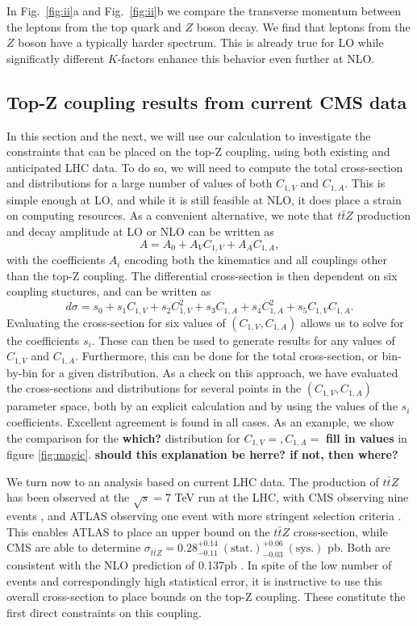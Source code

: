 \documentclass[preprint]{JHEP3} %
\def\ttbZ{t\bar{t}Z}
\begin{document}
In Fig.~\ref{fig:ii}a and Fig.~\ref{fig:ii}b we compare the transverse momentum between the leptons from the top quark and $Z$ boson decay.
We find that leptons from the $Z$ boson have a typically harder spectrum. 
This is already true for LO while significatly different $K$-factors enhance this behavior even further at NLO.

\subsection{Top-Z coupling results from current CMS data}
In this section and the next, we will use our calculation to investigate the constraints that can be placed on the top-Z coupling, using both existing and anticipated LHC data. To do so, we will need to compute the total cross-section and distributions for a large number of values of both $C_{1,V}$ and $C_{1,A}$. This is simple enough at LO, and while it is still feasible at NLO, it does place a strain on computing resources. As a convenient alternative, we note that $\ttbZ$ production and decay amplitude at LO or NLO can be written as
\begin{equation}
A = A_0 + A_V C_{1,V} + A_A C_{1,A},
\end{equation}
with the coefficients $A_i$ encoding both the kinematics and all couplings other than the top-Z coupling. The differential cross-section is then dependent on six coupling stuctures, and can be written as
\begin{equation}
d\sigma = s_0 +s_1C_{1,V} + s_2C_{1,V}^2 +s_3 C_{1,A}+s_4C_{1,A}^2+s_5C_{1,V}C_{1,A}.
\end{equation}
Evaluating the cross-section for six values of $(C_{1,V},C_{1,A})$ allows us to solve for the coefficients $s_i$. These can then be used to generate results for any values of $C_{1,V}$ and $C_{1,A}$. Furthermore, this can be done for the total cross-section, or bin-by-bin for a given distribution. As a check on this approach, we have evaluated the cross-sections and distributions for several points in the $(C_{1,V},C_{1,A})$ parameter space, both by an explicit calculation and by using the values of the $s_i$ coefficients. Excellent agreement is found in all cases. As an example, we show the comparison for the {\bf which?} distribution for $C_{1,V}=, C_{1,A}=$ {\bf fill in values} in figure \ref{fig:magic}. {\bf should this explanation be herre? if not, then where?}

We turn now to an analysis based on current LHC data. The production of $\ttbZ$ has been observed at the $\sqrt{s}=7$ TeV run at the LHC, with CMS observing nine events \cite{Chatrchyan:2013qca}, and ATLAS observing one event with more stringent selection criteria \cite{ATLAS-CONF-2012-126}. This enables ATLAS to place an upper bound on the $\ttbZ$ cross-section, while CMS are able to determine $\sigma_{\ttbZ} = 0.28^{+0.14}_{-0.11}~\mathrm{(stat.)}^{+0.06}_{-0.03}~ \mathrm{(sys.)}$ pb. Both are consistent with the NLO prediction of 0.137pb \cite{Garzelli:2011is}. In spite of the low number of events and correspondingly high statistical error, it is instructive to use this overall cross-section to place bounds on the top-Z coupling. These constitute the first direct constraints on this coupling.
\end{document}
